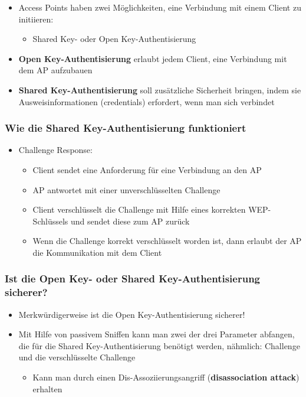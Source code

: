 \documentclass[openany]{book}
\begin{document}
\begin{itemize}
    \item Access Points haben zwei Möglichkeiten, eine Verbindung mit einem Client zu initiieren:
    \begin{itemize}
        \item Shared Key- oder Open Key-Authentisierung
    \end{itemize}
    \item \textbf{Open Key-Authentisierung} erlaubt jedem Client, eine Verbindung mit dem AP aufzubauen
    \item \textbf{Shared Key-Authentisierung} soll zusätzliche Sicherheit bringen, indem sie Ausweisinformationen (credentials) erfordert, wenn man sich verbindet
\end{itemize}

\subsubsection{Wie die Shared Key-Authentisierung funktioniert}

\begin{itemize}
    \item Challenge Response:
    \begin{itemize}
        \item Client sendet eine Anforderung für eine Verbindung an den AP
        \item AP antwortet mit einer unverschlüsselten Challenge
        \item Client verschlüsselt die Challenge mit Hilfe eines korrekten WEP-Schlüssels und sendet diese zum AP zurück
        \item Wenn die Challenge korrekt verschlüsselt worden ist, dann erlaubt der AP die Kommunikation mit dem Client
    \end{itemize}
\end{itemize}

\subsubsection{Ist die Open Key- oder Shared Key-Authentisierung sicherer?}

\begin{itemize}
    \item Merkwürdigerweise ist die Open Key-Authentisierung sicherer!
    \item Mit Hilfe von passivem Sniffen kann man zwei der drei Parameter abfangen, die für die Shared Key-Authentisierung benötigt werden, nähmlich: Challenge und die verschlüsselte Challenge
    \begin{itemize}
        \item Kann man durch einen Dis-Assoziierungsangriff (\textbf{disassociation attack}) erhalten
    \end{itemize} 
\end{itemize}
\end{document}

